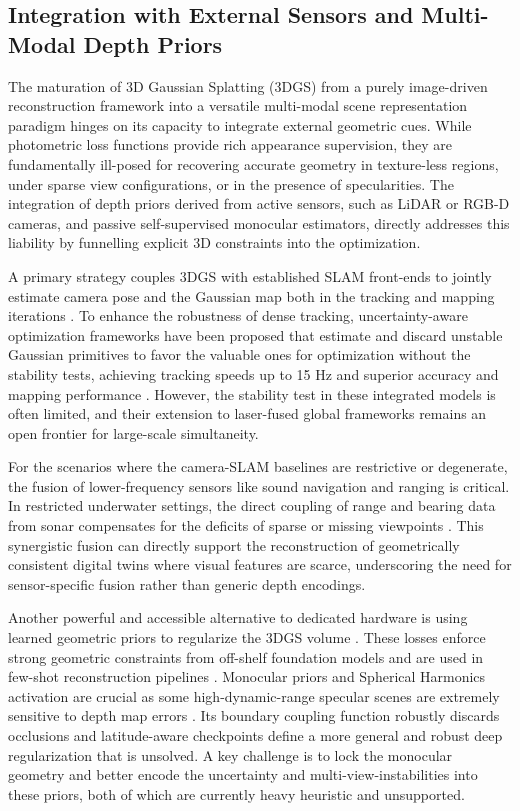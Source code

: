 \documentclass[11pt,a4paper]{article}
\begin{document}
\subsection{Integration with External Sensors and Multi-Modal Depth Priors}


The maturation of 3D Gaussian Splatting (3DGS) from a purely image-driven reconstruction framework into a versatile multi-modal scene representation paradigm hinges on its capacity to integrate external geometric cues. While photometric loss functions provide rich appearance supervision, they are fundamentally ill-posed for recovering accurate geometry in texture-less regions, under sparse view configurations, or in the presence of specularities. The integration of depth priors derived from active sensors, such as LiDAR or RGB-D cameras, and passive self-supervised monocular estimators, directly addresses this liability by funnelling explicit 3D constraints into the optimization.

A primary strategy couples 3DGS with established SLAM front-ends to jointly estimate camera pose and the Gaussian map both in the tracking and mapping iterations \cite{arxiv:2403.16095v1,arxiv:2402.13255v2}. To enhance the robustness of dense tracking, uncertainty-aware optimization frameworks have been proposed that estimate and discard unstable Gaussian primitives to favor the valuable ones for optimization without the stability tests, achieving tracking speeds up to 15 Hz and superior accuracy and mapping performance \cite{arxiv:2403.16095v1,arxiv:2402.13255v2}. However, the stability test in these integrated models is often limited, and their extension to laser-fused global frameworks remains an open frontier for large-scale simultaneity.

For the scenarios where the camera-SLAM baselines are restrictive or degenerate, the fusion of lower-frequency sensors like sound navigation and ranging is critical. In restricted underwater settings, the direct coupling of range and bearing data from sonar compensates for the deficits of sparse or missing viewpoints \cite{arxiv:2403.16095v1}. This synergistic fusion can directly support the reconstruction of geometrically consistent digital twins where visual features are scarce, underscoring the need for sensor-specific fusion rather than generic depth encodings.

Another powerful and accessible alternative to dedicated hardware is using learned geometric priors to regularize the 3DGS volume \cite{arxiv:2403.17822v1}. These losses enforce strong geometric constraints from off-shelf foundation models and are used in few-shot reconstruction pipelines \cite{arxiv:2404.17774v2}. Monocular priors and Spherical Harmonics activation are crucial as some high-dynamic-range specular scenes are extremely sensitive to depth map errors \cite{arxiv:2402.15870v1}. Its boundary coupling function robustly discards occlusions and latitude-aware checkpoints define a more general and robust deep regularization that is unsolved. A key challenge is to lock the monocular geometry and better encode the uncertainty and multi-view-instabilities into these priors, both of which are currently heavy heuristic and unsupported.
\end{document}
